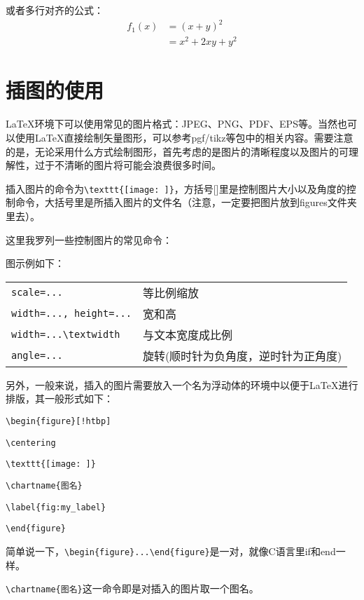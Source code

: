 或者多行对齐的公式：
\begin{equation}
  \begin{aligned}
    f_1(x)&=(x+y)^2\\
          &=x^2+2xy+y^2
  \end{aligned}
\end{equation}

\section{插图的使用}

\LaTeX 环境下可以使用常见的图片格式：JPEG、PNG、PDF、EPS等。当然也可以使用\LaTeX 直接绘制矢量图形，可以参考pgf/tikz等包中的相关内容。需要注意的是，无论采用什么方式绘制图形，首先考虑的是图片的清晰程度以及图片的可理解性，过于不清晰的图片将可能会浪费很多时间。

插入图片的命令为\verb|\texttt{[image: ]}|，方括号[]里是控制图片大小以及角度的控制命令，大括号{}里是所插入图片的文件名（注意，一定要把图片放到figures文件夹里去）。

这里我罗列一些控制图片的常见命令：

图示例如下：

\begin{tabular}{ll}
\verb|scale=...| & 等比例缩放 \\
\verb|width=..., height=...| & 宽和高 \\
\verb|width=...\textwidth| & 与文本宽度成比例\\
\verb|angle=...| & 旋转(顺时针为负角度，逆时针为正角度)\\
\end{tabular}

另外，一般来说，插入的图片需要放入一个名为浮动体的环境中以便于\LaTeX 进行排版，其一般形式如下：

\verb|\begin{figure}[!htbp]|\par
\verb|\centering|\par
\verb|\texttt{[image: ]}|\par
\verb|\chartname{图名}|\par
\verb|\label{fig:my_label}|\par
\verb|\end{figure}|

简单说一下，\verb|\begin{figure}...\end{figure}|是一对，就像C语言里if和end一样。

\verb|\chartname{图名}|这一命令即是对插入的图片取一个图名。

